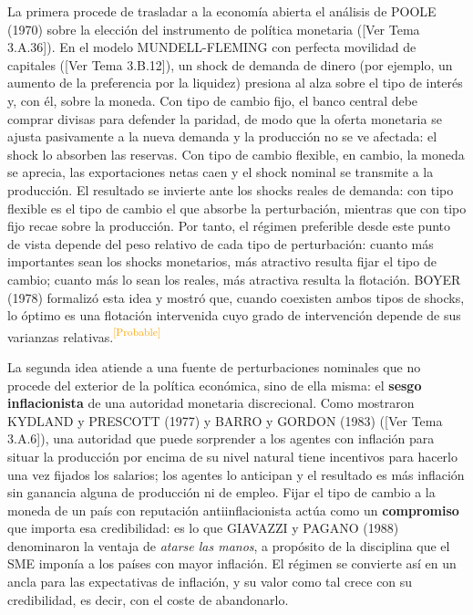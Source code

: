 \documentclass[10pt,a4paper]{article}
\newcommand{\authorfont}[1]{{\fontfamily{EBGaramond-TLF}\selectfont #1}}
\begin{document}
La primera procede de trasladar a la economía abierta el análisis de POOLE (1970) sobre la elección del instrumento de política monetaria ([\authorfont{Ver Tema 3.A.36}]). En el modelo MUNDELL-FLEMING con perfecta movilidad de capitales ([\authorfont{Ver Tema 3.B.12}]), un shock de demanda de dinero (por ejemplo, un aumento de la preferencia por la liquidez) presiona al alza sobre el tipo de interés y, con él, sobre la moneda. Con tipo de cambio fijo, el banco central debe comprar divisas para defender la paridad, de modo que la oferta monetaria se ajusta pasivamente a la nueva demanda y la producción no se ve afectada: el shock lo absorben las reservas. Con tipo de cambio flexible, en cambio, la moneda se aprecia, las exportaciones netas caen y el shock nominal se transmite a la producción. El resultado se invierte ante los shocks reales de demanda: con tipo flexible es el tipo de cambio el que absorbe la perturbación, mientras que con tipo fijo recae sobre la producción. Por tanto, el régimen preferible desde este punto de vista depende del peso relativo de cada tipo de perturbación: cuanto más importantes sean los shocks monetarios, más atractivo resulta fijar el tipo de cambio; cuanto más lo sean los reales, más atractiva resulta la flotación. BOYER (1978) formalizó esta idea y mostró que, cuando coexisten ambos tipos de shocks, lo óptimo es una flotación intervenida cuyo grado de intervención depende de sus varianzas relativas.\textcolor{orange}{\textsuperscript{[Probable]}}

La segunda idea atiende a una fuente de perturbaciones nominales que no procede del exterior de la política económica, sino de ella misma: el \textbf{sesgo inflacionista} de una autoridad monetaria discrecional. Como mostraron KYDLAND y PRESCOTT (1977) y BARRO y GORDON (1983) ([\authorfont{Ver Tema 3.A.6}]), una autoridad que puede sorprender a los agentes con inflación para situar la producción por encima de su nivel natural tiene incentivos para hacerlo una vez fijados los salarios; los agentes lo anticipan y el resultado es más inflación sin ganancia alguna de producción ni de empleo. Fijar el tipo de cambio a la moneda de un país con reputación antiinflacionista actúa como un \textbf{compromiso} que importa esa credibilidad: es lo que GIAVAZZI y PAGANO (1988) denominaron la ventaja de \textit{atarse las manos}, a propósito de la disciplina que el SME imponía a los países con mayor inflación. El régimen se convierte así en un ancla para las expectativas de inflación, y su valor como tal crece con su credibilidad, es decir, con el coste de abandonarlo.
\end{document}

